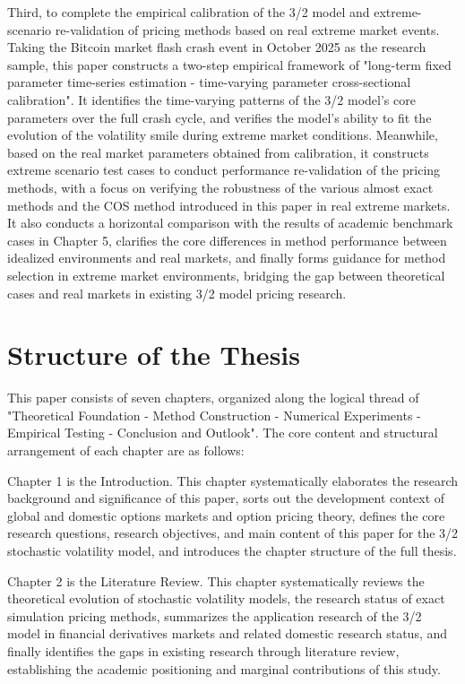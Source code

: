 Third, to complete the empirical calibration of the 3/2 model and extreme-scenario re-validation of pricing methods based on real extreme market events. Taking the Bitcoin market flash crash event in October 2025 as the research sample, this paper constructs a two-step empirical framework of "long-term fixed parameter time-series estimation - time-varying parameter cross-sectional calibration". It identifies the time-varying patterns of the 3/2 model's core parameters over the full crash cycle, and verifies the model's ability to fit the evolution of the volatility smile during extreme market conditions. Meanwhile, based on the real market parameters obtained from calibration, it constructs extreme scenario test cases to conduct performance re-validation of the pricing methods, with a focus on verifying the robustness of the various almost exact methods and the COS method introduced in this paper in real extreme markets. It also conducts a horizontal comparison with the results of academic benchmark cases in Chapter 5, clarifies the core differences in method performance between idealized environments and real markets, and finally forms guidance for method selection in extreme market environments, bridging the gap between theoretical cases and real markets in existing 3/2 model pricing research.

\section{Structure of the Thesis}
This paper consists of seven chapters, organized along the logical thread of "Theoretical Foundation - Method Construction - Numerical Experiments - Empirical Testing - Conclusion and Outlook". The core content and structural arrangement of each chapter are as follows:

Chapter 1 is the Introduction. This chapter systematically elaborates the research background and significance of this paper, sorts out the development context of global and domestic options markets and option pricing theory, defines the core research questions, research objectives, and main content of this paper for the 3/2 stochastic volatility model, and introduces the chapter structure of the full thesis.

Chapter 2 is the Literature Review. This chapter systematically reviews the theoretical evolution of stochastic volatility models, the research status of exact simulation pricing methods, summarizes the application research of the 3/2 model in financial derivatives markets and related domestic research status, and finally identifies the gaps in existing research through literature review, establishing the academic positioning and marginal contributions of this study.

